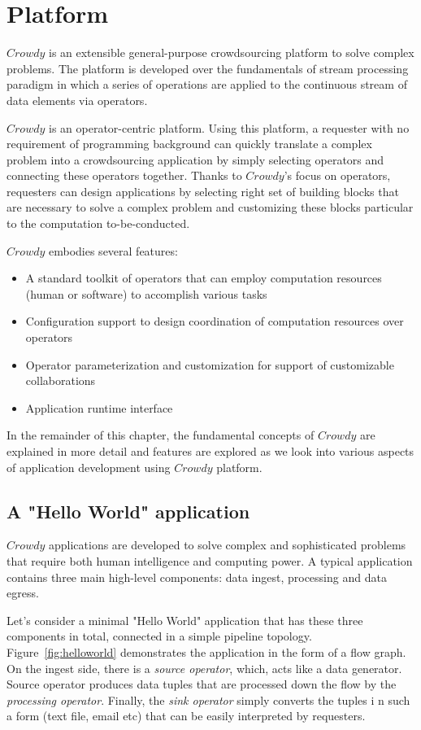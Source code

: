 \chapter{Platform}
\label{chap:platform}

$Crowdy$ is an extensible general-purpose crowdsourcing platform to solve 
complex problems. The platform is developed over the fundamentals of stream 
processing paradigm in which a series of operations are applied to the continuous 
stream of data elements via operators.

$Crowdy$ is an operator-centric platform. Using this platform, a requester with no 
requirement of programming background can quickly translate a complex problem into 
a crowdsourcing application by simply selecting operators and connecting these operators 
together. Thanks to $Crowdy$'s focus on operators, requesters can design applications 
by selecting right set of building blocks that are necessary to solve a complex problem 
and customizing these blocks particular to the computation to-be-conducted.

$Crowdy$ embodies several features:
\begin{itemize}
	\item A standard toolkit of operators that can employ computation resources 
	(human or software) to accomplish various tasks
	\item Configuration support to design coordination of computation resources 
	over operators
	\item Operator parameterization and customization for support of customizable 
	collaborations
	\item Application runtime interface
\end{itemize}

In the remainder of this chapter, the fundamental concepts of $Crowdy$ are explained 
in more detail and features are explored as we look into various aspects of application 
development using $Crowdy$ platform.

\section{A "Hello World" application}
$Crowdy$ applications are developed to solve complex and sophisticated problems 
that require both human intelligence and computing power. A typical application contains 
three main high-level components: data ingest, processing and data egress.

Let's consider a minimal "Hello World" application that has these three components 
in total, connected in a simple pipeline topology. Figure~\ref{fig:helloworld} demonstrates 
the application in the form of a flow graph. On the ingest side, there is a 
\textit{source operator}, which, acts like a data generator. Source operator produces 
data tuples that are processed down the flow by the 
\textit{processing operator}. Finally, the \textit{sink operator} simply converts the tuples i
n such a form (text file, email etc) that can be easily interpreted by requesters.

